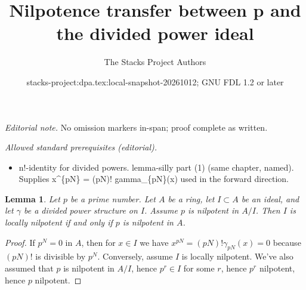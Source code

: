 \documentclass{stacks-project}
\title{Nilpotence transfer between p and the divided power ideal}
\author{The Stacks Project Authors}
\date{stacks-project:dpa.tex:local-snapshot-20261012; GNU FDL 1.2 or later}
\theoremstyle{plain}
\newtheorem{lemma}[subsection]{Lemma}
\theoremstyle{definition}
\theoremstyle{remark}
\numberwithin{equation}{subsection}
\begin{document}
\maketitle
\noindent\textit{Editorial note.} No omission markers in-span; proof complete as written.\par\medskip
\noindent\textit{Allowed standard prerequisites (editorial).}\begin{itemize}
\item n!-identity for divided powers. lemma-silly part (1) (same chapter, named). Supplies x\textasciicircum{}\{pN\} = (pN)! gamma\_\{pN\}(x) used in the forward direction.
\end{itemize}\medskip
\begin{lemma}
\label{lemma-nil}
Let $p$ be a prime number. Let $A$ be a ring, let $I \subset A$ be an ideal,
and let $\gamma$ be a divided power structure on $I$. Assume $p$ is nilpotent
in $A/I$. Then $I$ is locally nilpotent if and only if $p$ is nilpotent in $A$.
\end{lemma}

\begin{proof}
If $p^N = 0$ in $A$, then for $x \in I$ we have
$x^{pN} = (pN)!\gamma_{pN}(x) = 0$ because $(pN)!$ is
divisible by $p^N$. Conversely, assume $I$ is locally nilpotent.
We've also assumed that $p$ is nilpotent in $A/I$, hence
$p^r \in I$ for some $r$, hence $p^r$ nilpotent, hence $p$ nilpotent.
\end{proof}
\end{document}
